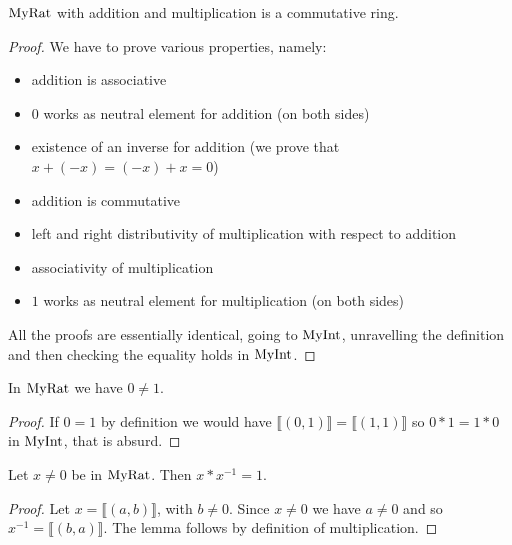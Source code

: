 \begin{proposition}
    \label{MyRat.commRing}
    \leanok
    $\mathrm{MyRat}$ with addition and multiplication is a commutative ring.
\end{proposition}
\begin{proof}
    \leanok
    We have to prove various properties, namely:
    \begin{itemize}
        \item addition is associative
        \item $0$ works as neutral element for addition (on both sides)
        \item existence of an inverse for addition (we prove that $x + (-x) = (-x) + x = 0$)
        \item addition is commutative
        \item left and right distributivity of multiplication with respect to addition
        \item associativity of multiplication
        \item $1$ works as neutral element for multiplication (on both sides)
    \end{itemize}
    All the proofs are essentially identical, going to $\mathrm{MyInt}$, unravelling the definition and then
    checking the equality holds in $\mathrm{MyInt}$.
\end{proof}

\begin{lemma}
    \label{MyRat.zero_ne_one}
    \leanok
In $\mathrm{MyRat}$ we have $0 \neq 1$.
\end{lemma}
\begin{proof}
    \leanok
    If $0 = 1$ by definition we would have $\llbracket (0,1) \rrbracket = \llbracket (1,1) \rrbracket$
    so $0*1=1*0$ in $\mathrm{MyInt}$, that is absurd.
\end{proof}

\begin{lemma}
    \label{MyRat.mul_inv_cancel}
    \leanok
Let $x \neq 0$ be in $\mathrm{MyRat}$. Then $x * x^{-1} = 1$.
\end{lemma}
\begin{proof}
    \leanok
    Let $x = \llbracket (a,b) \rrbracket$, with $b \neq 0$. Since $x \neq 0$ we have $a \neq 0$ and so
    $x^{-1} = \llbracket (b,a) \rrbracket$. The lemma follows by definition of multiplication.
\end{proof}

